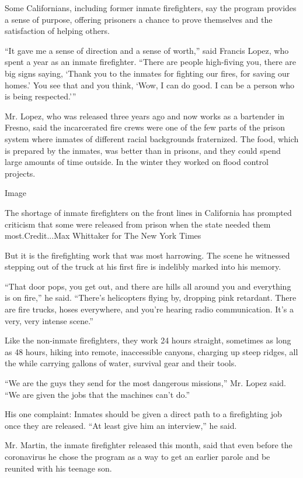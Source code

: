 Some Californians, including former inmate firefighters, say the program
provides a sense of purpose, offering prisoners a chance to prove
themselves and the satisfaction of helping others.

``It gave me a sense of direction and a sense of worth,'' said Francis
Lopez, who spent a year as an inmate firefighter. ``There are people
high-fiving you, there are big signs saying, `Thank you to the inmates
for fighting our fires, for saving our homes.' You see that and you
think, `Wow, I can do good. I can be a person who is being respected.'''

Mr. Lopez, who was released three years ago and now works as a bartender
in Fresno, said the incarcerated fire crews were one of the few parts of
the prison system where inmates of different racial backgrounds
fraternized. The food, which is prepared by the inmates, was better than
in prisons, and they could spend large amounts of time outside. In the
winter they worked on flood control projects.

Image

The shortage of inmate firefighters on the front lines in California has
prompted criticism that some were released from prison when the state
needed them most.Credit...Max Whittaker for The New York Times

But it is the firefighting work that was most harrowing. The scene he
witnessed stepping out of the truck at his first fire is indelibly
marked into his memory.

``That door pops, you get out, and there are hills all around you and
everything is on fire,'' he said. ``There's helicopters flying by,
dropping pink retardant. There are fire trucks, hoses everywhere, and
you're hearing radio communication. It's a very, very intense scene.''

Like the non-inmate firefighters, they work 24 hours straight, sometimes
as long as 48 hours, hiking into remote, inaccessible canyons, charging
up steep ridges, all the while carrying gallons of water, survival gear
and their tools.

``We are the guys they send for the most dangerous missions,'' Mr. Lopez
said. ``We are given the jobs that the machines can't do.''

His one complaint: Inmates should be given a direct path to a
firefighting job once they are released. ``At least give him an
interview,'' he said.

Mr. Martin, the inmate firefighter released this month, said that even
before the coronavirus he chose the program as a way to get an earlier
parole and be reunited with his teenage son.

